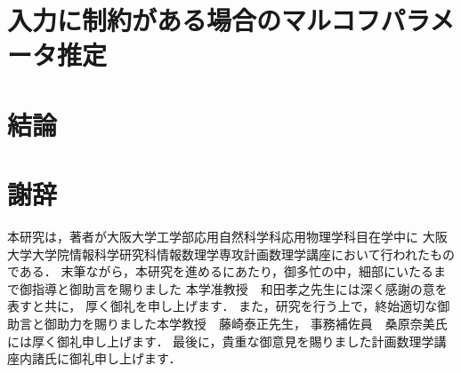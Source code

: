 \documentclass[a4paper,12pt,oneside,openany]{jsbook}
\begin{document}
\chapter{入力に制約がある場合のマルコフパラメータ推定}


\chapter{結論}


\chapter*{謝辞}
本研究は，著者が大阪大学工学部応用自然科学科応用物理学科目在学中に
大阪大学大学院情報科学研究科情報数理学専攻計画数理学講座において行われたものである．
末筆ながら，本研究を進めるにあたり，御多忙の中，細部にいたるまで御指導と御助言を賜りました
本学准教授　和田孝之先生には深く感謝の意を表すと共に，
厚く御礼を申し上げます．
また，研究を行う上で，終始適切な御助言と御助力を賜りました本学教授　藤崎泰正先生，
事務補佐員　桑原奈美氏には厚く御礼申し上げます．
最後に，貴重な御意見を賜りました計画数理学講座内諸氏に御礼申し上げます．
%

%  
% 
\end{document}
